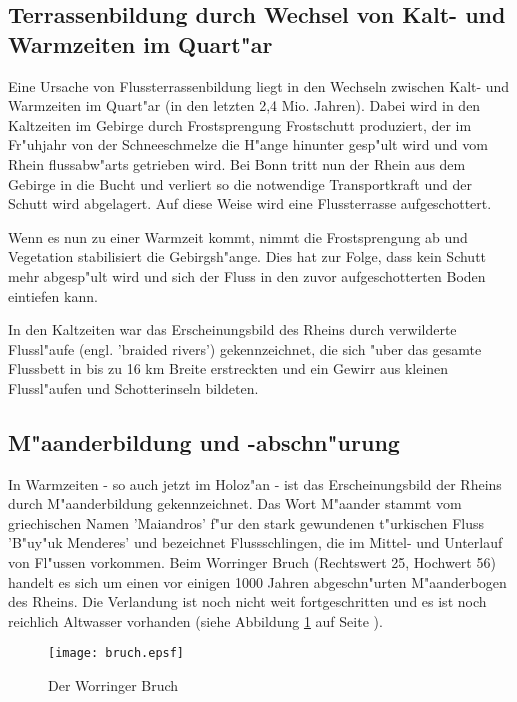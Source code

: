 \documentclass[titlepage,a4paper]{article}
\begin{document}
    \subsection{Terrassenbildung durch Wechsel von Kalt- und Warmzeiten im Quart"ar} \label{wild-fluss}
        
        Eine Ursache von Flussterrassenbildung liegt in den Wechseln zwischen Kalt- und Warmzeiten im Quart"ar (in den letzten 2,4 Mio. Jahren). Dabei wird in den Kaltzeiten im Gebirge durch Frostsprengung Frostschutt produziert, der im Fr"uhjahr von der Schneeschmelze die H"ange hinunter gesp"ult wird und vom Rhein flussabw"arts getrieben wird. Bei Bonn tritt nun der Rhein aus dem Gebirge in die Bucht und verliert so die notwendige Transportkraft und der Schutt wird abgelagert. Auf diese Weise wird eine Flussterrasse aufgeschottert.
        
        Wenn es nun zu einer Warmzeit kommt, nimmt die Frostsprengung ab und Vegetation stabilisiert die Gebirgsh"ange. Dies hat zur Folge, dass kein Schutt mehr abgesp"ult wird und sich der Fluss in den zuvor aufgeschotterten Boden eintiefen kann.
        
        In den Kaltzeiten war das Erscheinungsbild des Rheins durch verwilderte Flussl"aufe (engl. 'braided rivers') gekennzeichnet, die sich "uber das gesamte Flussbett in bis zu 16 km Breite erstreckten und ein Gewirr aus kleinen Flussl"aufen und Schotterinseln bildeten.
        
    \subsection{M"aanderbildung und -abschn"urung}
    
        In Warmzeiten - so auch jetzt im Holoz"an - ist das Erscheinungsbild der Rheins durch M"aanderbildung gekennzeichnet. Das Wort M"aander stammt  vom griechischen Namen 'Maiandros' f"ur den stark gewundenen t"urkischen Fluss 'B"uy"uk Menderes' und bezeichnet Flussschlingen, die im Mittel- und Unterlauf von Fl"ussen vorkommen. Beim Worringer Bruch (Rechtswert 25, Hochwert 56) handelt es sich um einen vor einigen 1000 Jahren abgeschn"urten M"aanderbogen des Rheins. Die Verlandung ist noch nicht weit fortgeschritten und es ist noch reichlich Altwasser vorhanden (siehe Abbildung \ref{bruch} auf Seite \pageref{bruch}). 

\begin{figure}
\begin{center}
\texttt{[image: bruch.epsf]}
\end{center}
\caption{Der Worringer Bruch} \label{bruch}
\end{figure}
\end{document}

